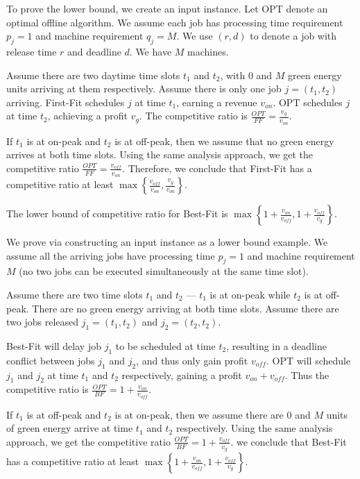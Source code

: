 \documentclass[conference]{IEEEtran}
\begin{document}
\begin{IEEEproof}
To prove the lower bound, we create an input instance. Let OPT denote an optimal offline algorithm. We assume each job has processing time requirement $p_j = 1$ and machine requirement $q_j = M$. We use $(r, d)$ to denote a job with release time $r$ and deadline $d$. We have $M$ machines.

Assume there are two daytime time slots $t_1$ and $t_2$, with $0$ and $M$ green energy units arriving at them respectively. Assume there is only one job $j = (t_1, t_2)$ arriving. First-Fit schedules $j$ at time $t_1$, earning a revenue $v_{on}$. OPT schedules $j$ at time $t_2$, achieving a profit $v_g$. The competitive ratio is $\frac{OPT}{FF} = \frac{v_g}{v_{on}}$.

If $t_1$ is at on-peak and $t_2$ is at off-peak, then we assume that no green energy arrives at both time slots. Using the same analysis approach, we get the competitive ratio $\frac{OPT}{FF} = \frac{v_{off}}{v_{on}}$. Therefore, we conclude that First-Fit has a competitive ratio at least $\max\left\lbrace \frac{v_{off}}{v_{on}}, \frac{v_g}{v_{on}}\right\rbrace$.
\end{IEEEproof}

\begin{theorem}
The lower bound of competitive ratio for Best-Fit is $\max\left\lbrace 1+\frac{v_{on}}{v_{off}}, 1 + \frac{v_{off}}{v_g}\right\rbrace$.
\label{comRatio_BF}
\end{theorem}

\begin{IEEEproof}
We prove via constructing an input instance as a lower bound example. We assume all the arriving jobs have processing time $p_j = 1$ and machine requirement $M$ (no two jobs can be executed simultaneously at the same time slot).

Assume there are two time slots $t_1$ and $t_2$ --- $t_1$ is at on-peak while $t_2$ is at off-peak. There are no green energy arriving at both time slots. Assume there are two jobs released $j_1 = (t_1, t_2)$ and $j_2 = (t_2, t_2)$.

Best-Fit will delay job $j_1$ to be scheduled at time $t_2$, resulting in a deadline conflict between jobs $j_1$ and $j_2$, and thus only gain profit $v_{off}$. OPT will schedule $j_1$ and $j_2$ at time $t_1$ and $t_2$ respectively, gaining a profit $v_{on} + v_{off}$. Thus the competitive ratio is $\frac{OPT}{BF} = 1 + \frac{v_{on}}{v_{off}}$.

If $t_1$ is at off-peak and $t_2$ is at on-peak, then we assume there are $0$ and $M$ units of green energy arrive at time $t_1$ and $t_2$ respectively. Using the same analysis approach, we get the competitive ratio $\frac{OPT}{BF} = 1 + \frac{v_{off}}{v_g}$. we conclude that Best-Fit has a competitive ratio at least $\max\left\lbrace 1 + \frac{v_{on}}{v_{off}}, 1 + \frac{v_{off}}{v_g}\right\rbrace$.
\end{IEEEproof}
\end{document}
